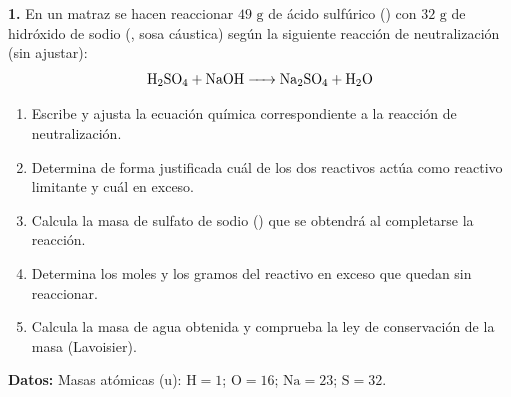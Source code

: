 ﻿\documentclass[11pt,a4paper]{article}
\begin{document}
\pagestyle{empty}

\noindent\textbf{1.} En un matraz se hacen reaccionar $49\text{ g}$ de ácido sulfúrico () con $32\text{ g}$ de hidróxido de sodio (, sosa cáustica) según la siguiente reacción de neutralización (sin ajustar):
\[
\ce{H2SO4 + NaOH -> Na2SO4 + H2O}
\]

\begin{enumerate}[label=\textbf{\alph*)}, leftmargin=2em, itemsep=6pt]
    \item Escribe y ajusta la ecuación química correspondiente a la reacción de neutralización.
    \item Determina de forma justificada cuál de los dos reactivos actúa como reactivo limitante y cuál en exceso.
    \item Calcula la masa de sulfato de sodio () que se obtendrá al completarse la reacción.
    \item Determina los moles y los gramos del reactivo en exceso que quedan sin reaccionar.
    \item Calcula la masa de agua obtenida y comprueba la ley de conservación de la masa (Lavoisier).
\end{enumerate}

\vspace{0.4cm}
\noindent\textbf{Datos:} Masas atómicas ($\text{u}$): $\mathrm{H} = 1$; $\mathrm{O} = 16$; $\mathrm{Na} = 23$; $\mathrm{S} = 32$.
\end{document}
